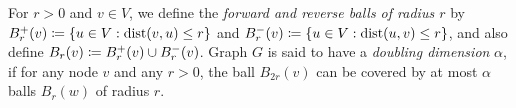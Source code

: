 For $r>0$ and $v\in V$, we define the \emph{forward and reverse balls of radius $r$} by $B^+_r(v)\coloneqq\{u\in V: \mbox{dist}(v,u)\leq r\}$ and $B^-_r(v)\coloneqq\{u\in V: \mbox{dist}(u,v)\leq r\}$, and also define $B_r(v)\coloneqq B^+_r(v)\cup B^-_r(v)$.
Graph $G$ is said to have a \emph{doubling dimension} $\alpha$, if for any node $v$ and any $r>0$, the ball $B_{2r}(v)$ can be covered by at most $\alpha$ balls $B_r(w)$ of radius $r$. 


